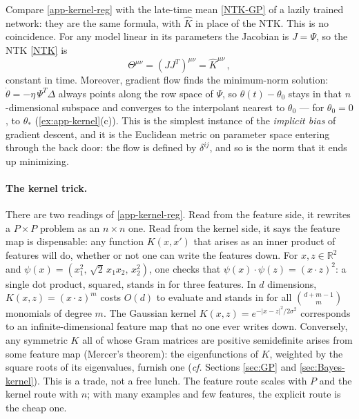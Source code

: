 \documentclass[11pt]{article}
\newcommand{\R}{\mathbb{R}}
\begin{document}
Compare \eqref{app-kernel-reg} with the late-time mean \eqref{NTK-GP} of a lazily trained network: they are the same formula, with $\hat K$ in place of the NTK. This is no coincidence. For any model linear in its parameters the Jacobian is $J=\Psi$, so the NTK \eqref{NTK} is
%
\begin{equation}
    \Theta^{\mu\nu} = (JJ^T)^{\mu\nu} = \hat K^{\mu\nu}\,, \label{app-NTK-is-K}
\end{equation}
%
constant in time. Moreover, gradient flow finds the minimum-norm solution: $\dot\theta = -\eta\,\Psi^T\Delta$ always points along the row space of $\Psi$, so $\theta(t)-\theta_0$ stays in that $n$-dimensional subspace and converges to the interpolant nearest to $\theta_0$ --- for $\theta_0 = 0$, to $\theta_*$ (\cref{ex:app-kernel}(c)). This is the simplest instance of the \emph{implicit bias} of gradient descent, and it is the Euclidean metric on parameter space entering through the back door: the flow is defined by $\delta^{ij}$, and so is the norm that it ends up minimizing.

\paragraph{The kernel trick.} There are two readings of \eqref{app-kernel-reg}. Read from the feature side, it rewrites a $P\times P$ problem as an $n\times n$ one. Read from the kernel side, it says the feature map is dispensable: any function $K(x,x')$ that arises as an inner product of features will do, whether or not one can write the features down. For $x,z\in\R^2$ and $\psi(x) = (x_1^2,\,\sqrt2\,x_1x_2,\,x_2^2)$, one checks that $\psi(x)\cdot\psi(z) = (x\cdot z)^2$: a single dot product, squared, stands in for three features. In $d$ dimensions, $K(x,z) = (x\cdot z)^m$ costs $O(d)$ to evaluate and stands in for all $\binom{d+m-1}{m}$ monomials of degree $m$. The Gaussian kernel $K(x,z) = e^{-|x-z|^2/2\sigma^2}$ corresponds to an infinite-dimensional feature map that no one ever writes down. Conversely, any symmetric $K$ all of whose Gram matrices are positive semidefinite arises from some feature map (Mercer's theorem): the eigenfunctions of $K$, weighted by the square roots of its eigenvalues, furnish one (\emph{cf.} Sections \ref{sec:GP} and \ref{sec:Bayes-kernel}). This is a trade, not a free lunch. The feature route scales with $P$ and the kernel route with $n$; with many examples and few features, the explicit route is the cheap one.
\end{document}
